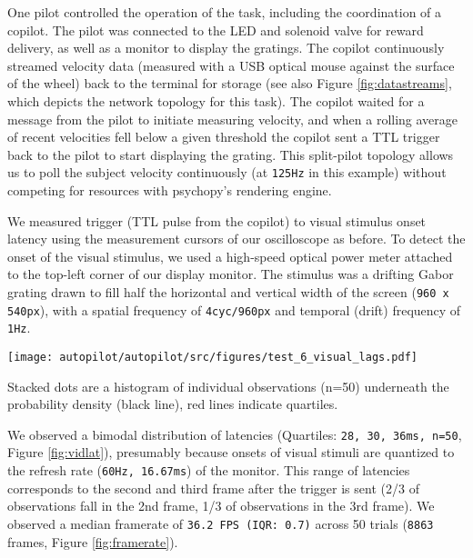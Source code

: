 One pilot controlled the operation of the task, including the coordination of a copilot. The pilot was connected to the LED and solenoid valve for reward delivery, as well as a monitor to display the gratings. The copilot continuously streamed velocity data (measured with a USB optical mouse against the surface of the wheel) back to the terminal for storage (see also Figure \ref{fig:datastreams}, which depicts the network topology for this task). The copilot waited for a message from the pilot to initiate measuring velocity, and when a rolling average of recent velocities fell below a given threshold the copilot sent a TTL trigger back to the pilot to start displaying the grating. This split-pilot topology allows us to poll the subject velocity continuously (at \texttt{125Hz} in this example) without competing for resources with psychopy's rendering engine.

We measured trigger (TTL pulse from the copilot) to visual stimulus onset latency using the measurement cursors of our oscilloscope as before. To detect the onset of the visual stimulus, we used a high-speed optical power meter attached to the top-left corner of our display monitor. The stimulus was a drifting Gabor grating drawn to fill half the horizontal and vertical width of the screen (\texttt{960 x 540px}), with a spatial frequency of \texttt{4cyc/960px} and temporal (drift) frequency of \texttt{1Hz}.

\begin{marginfigure}[-0cm]
\texttt{[image: autopilot/autopilot/src/figures/test\_6\_visual\_lags.pdf]}
\caption{Stacked dots are a histogram of individual observations (n=50) underneath the probability density (black line), red lines indicate quartiles.}
\label{fig:vidlat}
\end{marginfigure}

We observed a bimodal distribution of latencies (Quartiles: \texttt{28, 30, 36ms, n=50}, Figure \ref{fig:vidlat}), presumably because onsets of visual stimuli are quantized to the refresh rate (\texttt{60Hz, 16.67ms}) of the monitor. This range of latencies corresponds to the second and third frame after the trigger is sent (2/3 of observations fall in the 2nd frame, 1/3 of observations in the 3rd frame). We observed a median framerate of \texttt{36.2 FPS (IQR: 0.7)} across 50 trials (\texttt{8863} frames, Figure \ref{fig:framerate}). 

